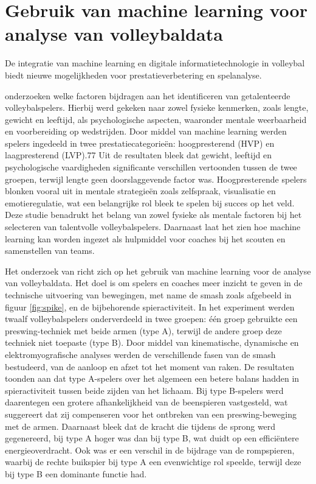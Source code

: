 \section{Gebruik van machine learning voor analyse van volleybaldata}
De integratie van machine learning en digitale informatietechnologie in volleybal biedt nieuwe mogelijkheden voor prestatieverbetering en spelanalyse.

\textcite{Musa2021} onderzoeken welke factoren bijdragen aan het identificeren van getalenteerde volleybalspelers. Hierbij werd gekeken naar zowel fysieke kenmerken, zoals lengte, gewicht en leeftijd, als psychologische aspecten, waaronder mentale weerbaarheid en voorbereiding op wedstrijden. Door middel van machine learning werden spelers ingedeeld in twee prestatiecategorieën: hoogpresterend (HVP) en laagpresterend (LVP).77
Uit de resultaten bleek dat gewicht, leeftijd en psychologische vaardigheden significante verschillen vertoonden tussen de twee groepen, terwijl lengte geen doorslaggevende factor was. Hoogpresterende spelers blonken vooral uit in mentale strategieën zoals zelfspraak, visualisatie en emotieregulatie, wat een belangrijke rol bleek te spelen bij succes op het veld.
Deze studie benadrukt het belang van zowel fysieke als mentale factoren bij het selecteren van talentvolle volleybalspelers. Daarnaast laat het zien hoe machine learning kan worden ingezet als hulpmiddel voor coaches bij het scouten en samenstellen van teams.

Het onderzoek van \textcite{Dai2021} richt zich op het gebruik van machine learning voor de analyse van volleybaldata. Het doel is om spelers en coaches meer inzicht te geven in de technische uitvoering van bewegingen, met name de smash zoals afgebeeld in figuur \ref{fig:spike}, en de bijbehorende spieractiviteit. In het experiment werden twaalf volleybalspelers onderverdeeld in twee groepen: één groep gebruikte een preswing-techniek met beide armen (type A), terwijl de andere groep deze techniek niet toepaste (type B).
Door middel van kinematische, dynamische en elektromyografische analyses werden de verschillende fasen van de smash bestudeerd, van de aanloop en afzet tot het moment van raken. De resultaten toonden aan dat type A-spelers over het algemeen een betere balans hadden in spieractiviteit tussen beide zijden van het lichaam. Bij type B-spelers werd daarentegen een grotere afhankelijkheid van de beenspieren vastgesteld, wat suggereert dat zij compenseren voor het ontbreken van een preswing-beweging met de armen.
Daarnaast bleek dat de kracht die tijdens de sprong werd gegenereerd, bij type A hoger was dan bij type B, wat duidt op een efficiëntere energieoverdracht. Ook was er een verschil in de bijdrage van de rompspieren, waarbij de rechte buikspier bij type A een evenwichtige rol speelde, terwijl deze bij type B een dominante functie had.


